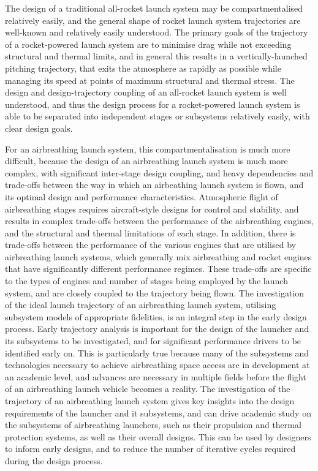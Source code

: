     The design of a traditional all-rocket launch system may be compartmentalised relatively easily, and the general shape of rocket launch system trajectories are well-known and relatively easily understood.  The primary goals of the trajectory of a rocket-powered launch system are to minimise drag while not exceeding structural and thermal limits, and in general this results in a vertically-launched pitching trajectory, that exits the atmosphere as rapidly as possible while managing its speed at points of maximum structural and thermal stress. The design and design-trajectory coupling of an all-rocket launch system is well understood, and thus the design process for a rocket-powered launch system is able to be separated into independent stages or subsystems relatively easily, with clear design goals. 
    
   
    
    For an airbreathing launch system, this compartmentalisation is much more difficult, because the design of an airbreathing launch system is much more complex, with significant inter-stage design coupling, and heavy dependencies and trade-offs between the way in which an airbeathing launch system is flown, and its optimal design and performance characteristics. Atmospheric flight of airbreathing stages requires aircraft-style designs for control and stability, and results in complex trade-offs between the performance of the airbreathing engines, and the structural and thermal limitations of each stage. In addition, there is trade-offs between the performance of the various engines that are utilised by airbreathing launch systems, which generally mix airbreathing and rocket engines that have significantly different performance regimes.
    These trade-offs are specific to the types of engines and number of stages being employed by the launch system, and are closely coupled to the trajectory being flown. The investigation of the ideal launch trajectory of an airbreathing launch system, utilising subsystem models of appropriate fidelities, is an integral step in the early design process. Early trajectory analysis is important for the design of the launcher and its subsystems to be investigated, and for significant performance drivers to be identified early on. 
  This is particularly true because many of the subsystems and technologies necessary to achieve airbreathing space access are in development at an academic level, and advances are necessary in multiple fields before the flight of an airbreathing launch vehicle becomes a reality. The investigation of the trajectory of an airbreathing launch system gives key insights into the design requirements of the launcher and it subsystems, and can drive academic study on the subsystems of airbreathing launchers, such as their propulsion and thermal protection systems, as well as their overall designs. This can be used by designers to inform early designs, and to reduce the number of iterative cycles required during the design process. 
    
  